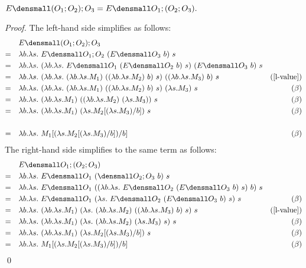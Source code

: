 \begin{lemma}
  \label{thm:ext-compose-assoc}
  \\
  $ E\den{(O_1;O_2);O_3} = E\den{O_1;(O_2;O_3)}.$
\end{lemma}
\begin{proof}
  The left-hand side simplifies as follows:
  \begin{align*}
    &\quad E\den{(O_1;O_2);O_3} \\
    =& \quad \lambda b. \lambda s.~ E\den{O_1;O_2} ~(E\den{O_3} ~b) ~s \\
    =& \quad \lambda b. \lambda s.~ (\lambda b. \lambda s.~ E\den{O_1} ~(E\den{O_2} ~b) ~s) ~(E\den{O_3} ~b) ~s \\
    =& \quad \lambda b. \lambda s.~ (\lambda b. \lambda s.~ (\lambda b. \lambda s. M_1) ~((\lambda b. \lambda s. M_2) ~b) ~s) ~((\lambda b. \lambda s. M_3) ~b) ~s & (\cref{l-value}) \\
    =& \quad \lambda b. \lambda s.~ (\lambda b. \lambda s.~ (\lambda b. \lambda s. M_1) ~((\lambda b. \lambda s. M_2) ~b) ~s) ~(\lambda s. M_3) ~s & (\beta) \\
    =& \quad \lambda b. \lambda s.~ (\lambda b. \lambda s. M_1) ~((\lambda b. \lambda s. M_2) ~(\lambda s. M_3)) ~s & (\beta) \\
    =& \quad \lambda b. \lambda s.~ (\lambda b. \lambda s. M_1) ~(\lambda s. M_2\subst{b}{(\lambda s. M_3)}) ~s & (\beta) \\
    \\
    =& \quad \lambda b. \lambda s.~ M_1\subst{b}{(\lambda s. M_2\subst{b}{(\lambda s. M_3)})} & (\beta) \\
  \end{align*}
  The right-hand side simplifies to the same term as follows:
  \begin{align*}
    &\quad E\den{O_1;(O_2;O_3)} \\
    =& \quad \lambda b. \lambda s.~ E\den{O_1} ~(\den{O_2;O_3} ~b) ~s \\
    =& \quad \lambda b. \lambda s.~ E\den{O_1} ~((\lambda b. \lambda s.~ E\den{O_2} ~(E\den{O_3} ~b) ~s) ~b) ~s \\
    =& \quad \lambda b. \lambda s.~ E\den{O_1} ~(\lambda s.~ E\den{O_2} ~(E\den{O_3} ~b) ~s) ~s & (\beta)\\
    =& \quad \lambda b. \lambda s.~ (\lambda b. \lambda s. M_1) ~(\lambda s.~ (\lambda b. \lambda s. M_2) ~((\lambda b. \lambda s. M_3) ~b) ~s) ~s & (\cref{l-value}) \\
    =& \quad \lambda b. \lambda s.~ (\lambda b. \lambda s. M_1) ~(\lambda s.~ (\lambda b. \lambda s. M_2) ~(\lambda s. M_3) ~s) ~s & (\beta) \\
    =& \quad \lambda b. \lambda s.~ (\lambda b. \lambda s. M_1) ~(\lambda s. M_2\subst{b}{(\lambda s. M_3)}) ~s & (\beta) \\
    =& \quad \lambda b. \lambda s.~ M_1\subst{b}{(\lambda s. M_2\subst{b}{(\lambda s. M_3)})} & (\beta)
  \end{align*}
  \qed
\end{proof}

